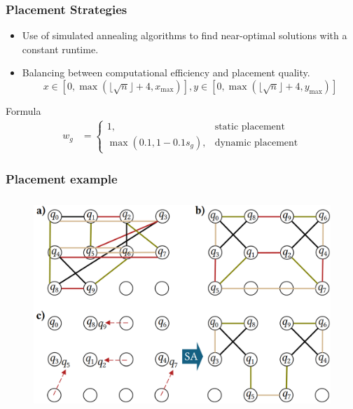 \documentclass[18 pt]{beamer}
\begin{document}
\begin{frame}
    \frametitle{Placement Strategies}
    \begin{itemize}
        \item Use of simulated annealing algorithms to find near-optimal solutions with a constant runtime.
        \item Balancing between computational efficiency and placement quality.
        \[
x \in \left[0, \max\left(\lfloor \sqrt{n} \rfloor + 4, x_{\max}\right)\right],
y \in \left[0, \max\left(\lfloor \sqrt{n} \rfloor + 4, y_{\max}\right)\right]
\]
    \end{itemize}
    \begin{block}{Formula}
        \begin{align*}
            w_g & = \begin{cases}
            1, &\text{static placement}
             \\ 
            \max\left(0.1,1-0.1s_g\right), &\text{dynamic placement}
            \end{cases}
        \end{align*}
    \end{block}
\end{frame}
\begin{frame}
    \frametitle{Placement example}
    \begin{figure}
        \includegraphics[height = 8cm]{placement.png}
    \end{figure}
\end{frame}
\end{document}
